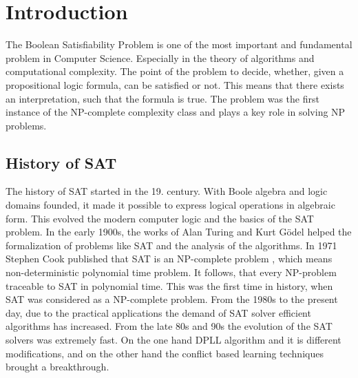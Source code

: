 \documentclass{article}
\begin{document}
\vspace*{\fill}

\newpage







\section{Introduction}
\label{sec:intro}

The Boolean Satisfiability Problem is one of the most important and fundamental problem in Computer Science. Especially in the theory of algorithms and computational complexity. The point of the problem to decide, whether, given a propositional logic formula, can be satisfied or not. This means that there exists an interpretation, such that the formula is true. The problem was the first instance of the NP-complete complexity class and plays a key role in solving NP problems.

\subsection{History of SAT}
The history of SAT started in the 19. century. With Boole algebra and logic domains founded, it made it possible to express logical operations in algebraic form. This evolved the modern computer logic and the basics of the SAT problem. In the early 1900s, the works of Alan Turing \cite{turing} and Kurt Gödel helped the formalization of problems like SAT and the analysis of the algorithms. In 1971 Stephen Cook published that SAT is an NP-complete problem \cite{satIsNPComplete}, which means non-deterministic polynomial time problem. It follows, that every NP-problem traceable to SAT in polynomial time. This was the first time in history, when SAT was considered as a NP-complete problem. From the 1980s to the present day, due to the practical applications the demand of SAT solver efficient algorithms has increased. From the late 80s and 90s the evolution of the SAT solvers was extremely fast. On the one hand DPLL algorithm \cite{dpll} and it is different modifications, and on the other hand the conflict based learning techniques brought a breakthrough.
\end{document}
